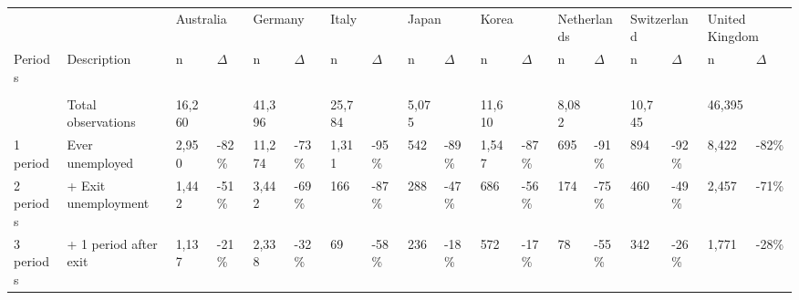 \begin{tabular}{llllllllllllllllll}
   \toprule 
 
&&
\multicolumn{2}{l}{Australia} &
\multicolumn{2}{l}{Germany} &
\multicolumn{2}{l}{Italy} &
\multicolumn{2}{l}{Japan} &
\multicolumn{2}{l}{Korea} &
\multicolumn{2}{l}{Netherlands} &
\multicolumn{2}{l}{Switzerland} &
\multicolumn{2}{l}{United Kingdom}
\\  
 
 
\multicolumn{1}{l}{Periods} & 
\multicolumn{1}{l}{Description} 
& n & $\Delta$
& n & $\Delta$
& n & $\Delta$
& n & $\Delta$
& n & $\Delta$
& n & $\Delta$
& n & $\Delta$
& n & $\Delta$
\\ 
\cmidrule(lr){1-2}
\cmidrule(lr){3-4}
\cmidrule(lr){5-6}
\cmidrule(lr){7-8}
\cmidrule(lr){9-10}
\cmidrule(lr){11-12}
\cmidrule(lr){13-14}
\cmidrule(lr){15-16}
\cmidrule(lr){17-18}
\\[-1.8ex]  
 
 & Total observations & 16,260 &  & 41,396 &  & 25,784 &  & 5,075 &  & 11,610 &  & 8,082 &  & 10,745 &  & 46,395 &  \\ 
  1 period & Ever unemployed & 2,950 & -82\% & 11,274 & -73\% & 1,311 & -95\% & 542 & -89\% & 1,547 & -87\% & 695 & -91\% & 894 & -92\% & 8,422 & -82\% \\ 
  2 periods & + Exit unemployment & 1,442 & -51\% & 3,442 & -69\% & 166 & -87\% & 288 & -47\% & 686 & -56\% & 174 & -75\% & 460 & -49\% & 2,457 & -71\% \\ 
  3 periods & + 1 period after exit & 1,137 & -21\% & 2,338 & -32\% & 69 & -58\% & 236 & -18\% & 572 & -17\% & 78 & -55\% & 342 & -26\% & 1,771 & -28\% \\ 
   \bottomrule  
\end{tabular}
